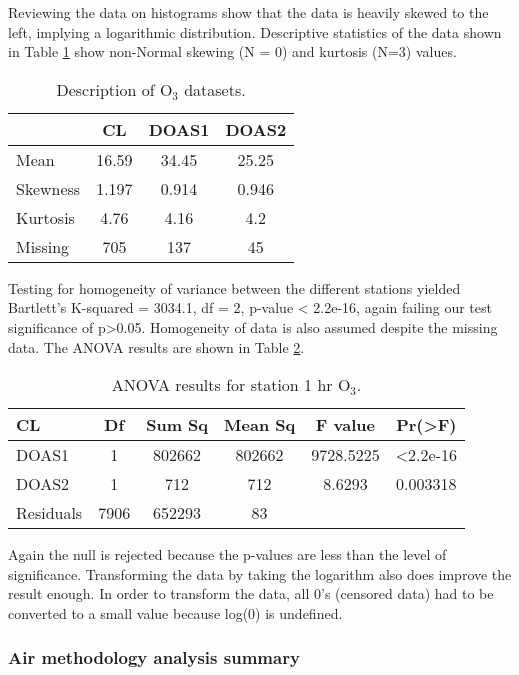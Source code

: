 Reviewing the data on histograms show that the data is heavily skewed to the left, implying a logarithmic distribution. Descriptive statistics of the data shown in Table \ref{tab:o3sets} show non-Normal skewing (N = 0) and kurtosis (N=3) values.
%
\begin{table}[H]
\centering
\caption{Description of O$_{3}$ datasets.}
\label{tab:o3sets}
\begin{tabular}{@{}lccc@{}}
\toprule
 & \textbf{CL} & \textbf{DOAS1} & \textbf{DOAS2} \\ \midrule
Mean & 16.59 & 34.45 & 25.25 \\
Skewness & 1.197 & 0.914 & 0.946 \\
Kurtosis & 4.76 & 4.16 & 4.2 \\
Missing & 705 & 137 & 45 \\ \bottomrule
\end{tabular}
\end{table}
%

Testing for  homogeneity of variance between the different stations yielded Bartlett's K-squared = 3034.1, df = 2, p-value < 2.2e-16, again failing our test significance of p>0.05. Homogeneity of data is also assumed despite the missing data. The ANOVA results are shown in Table \ref{tab:anovao3}.

\begin{table}[H]
\centering
\caption{ANOVA results for station 1 hr O$_{3}$. }
\label{tab:anovao3}
\begin{tabular}{@{}lccccc@{}}
\toprule
\textbf{CL} & \textbf{Df} & \textbf{Sum Sq} & \textbf{Mean Sq} & \textbf{F value} & \textbf{Pr(>F)} \\ \midrule
DOAS1 & 1 & 802662 & 802662 & 9728.5225 & \textless 2.2e-16 \\
DOAS2 & 1 & 712 & 712 & 8.6293 & 0.003318 \\
Residuals & 7906 & 652293 & 83 &  &  \\ \bottomrule
\end{tabular}
\end{table}

Again the null is rejected because the p-values are less than the level of significance. Transforming the data by taking the logarithm also does improve the result enough. In order to transform the data, all 0's (censored data) had to be converted to a small value because log(0) is undefined. 

\subsubsection{Air methodology analysis summary}

